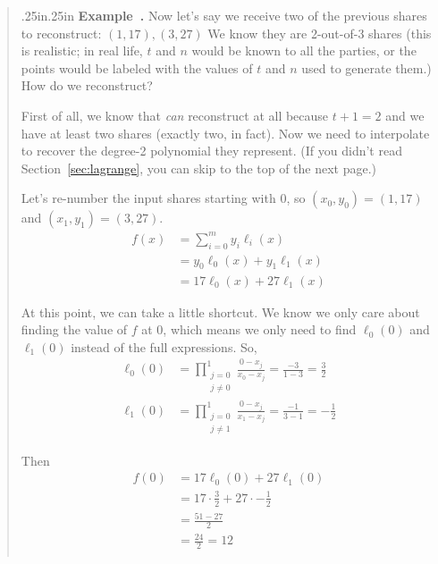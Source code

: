 \documentclass[12 pt]{article}
\newcounter{example}[section]
\newenvironment{example}{\refstepcounter{example}\par\bigskip \begin{quotation}{}{\leftmargin .25in\rightmargin .25in}
    \noindent \textbf{Example~\thesection.\theexample }  \rmfamily}{\end{quotation}\par\bigskip}
\begin{document}
\begin{example}
    Now let's say we receive two of the previous shares to reconstruct:
    $(1,17),(3,27)$ We know they are 2-out-of-3 shares (this is realistic; 
    in real life, $t$ and $n$ would be known to all the parties, or the 
    points would be labeled with the values of $t$ and $n$ used to 
    generate them.) How do we reconstruct?

    First of all, we know that \emph{can} reconstruct at all because 
    $t+1 = 2$ and we have at least two shares (exactly two, in fact). 
    Now we need to interpolate to recover the degree-2 polynomial 
    they represent. (If you didn't read Section~\ref{sec:lagrange}, 
    you can skip to the top of the next page.)

    Let's re-number the input shares starting with 
    0, so $(x_0,y_0) = (1,17)$ and $(x_1,y_1) = (3,27)$.
    \begin{align*}
        f(x) &= \sum_{i=0}^{m} y_i \ell_i(x)\\
        &= y_0 \ell_0(x) + y_1 \ell_1(x)\\
        &= 17 \ell_0(x) + 27 \ell_1(x)
    \end{align*}

    At this point, we can take a little shortcut. We know we only 
    care about finding the value of $f$ at 0, which means we only 
    need to find $\ell_0(0)$ and $\ell_1(0)$ instead of the full 
    expressions. So,
    \begin{align*}
        \ell_0(0) &= \prod_{\substack{j=0\\j\neq 0}}^{1} \frac{0-x_j}{x_0-x_j}
        = \frac{-3}{1-3}
        = \frac{3}{2}\\
        \ell_1(0) &= \prod_{\substack{j=0\\j\neq 1}}^{1} \frac{0-x_j}{x_1-x_j}
        = \frac{-1}{3-1}
        = -\frac{1}{2}
    \end{align*}

    Then 
    \begin{align*}
        f(0) &= 17 \ell_0(0) + 27 \ell_1(0)\\
        &= 17 \cdot \frac{3}{2} + 27 \cdot -\frac{1}{2}\\
        &= \frac{51-27}{2}\\
        &= \frac{24}{2} = 12\\
    \end{align*}
\end{example}
\end{document}

